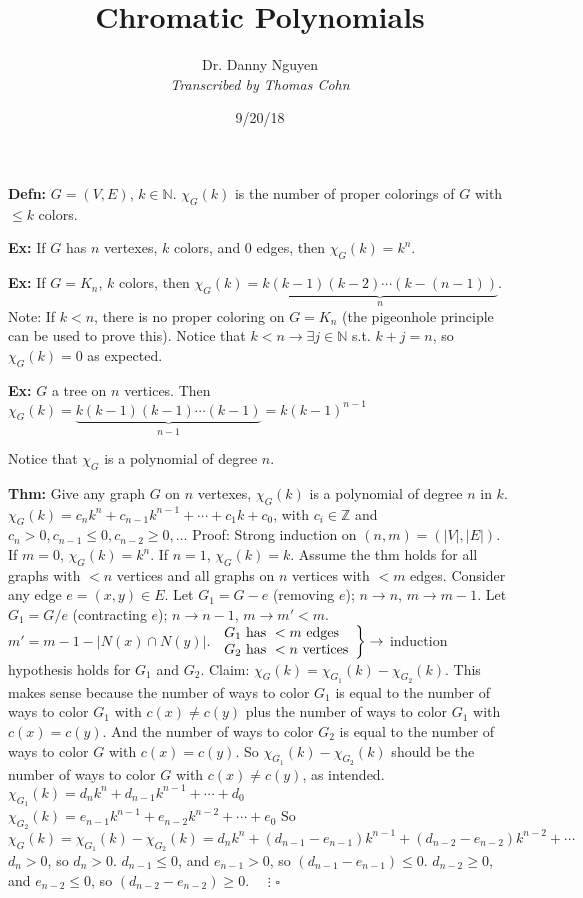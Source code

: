 \documentclass[10pt,letterpaper]{article}
\author{Dr. Danny Nguyen\\ \small\textit{Transcribed by Thomas Cohn}}
\title{Chromatic Polynomials}
\date{9/20/18} %
\newcommand{\n}{\hfill\break}
\newcommand{\defn}[1]{\par\noindent\settowidth{\hangindent}{\textbf{Defn: }}\textbf{Defn: }#1\n}
\newcommand{\thm}[1]{\par\noindent\settowidth{\hangindent}{\textbf{Thm: }}\textbf{Thm: }#1\n}
\newcommand{\ex}[1]{\par\noindent\settowidth{\hangindent}{\textbf{Ex: }}\textbf{Ex: }#1\n}
\newcommand{\proven}{\;$\square$\n}
\newcommand{\ptxt}[1]{\textrm{\textnormal{#1}}}
\newcommand{\card}[1]{\left|#1\right|}
\newcommand{\naturals}{\mathbb{N}}
\newcommand{\N}{\naturals}
\newcommand{\integers}{\mathbb{Z}}
\newcommand{\Z}{\integers}
\newcommand{\st}{s.t.}
\begin{document}
\maketitle
\setlength\RaggedRightParindent{\parindent}
\RaggedRight

\defn{$G=(V,E)$, $k\in\N$.\n
$\chi_{G}(k)$ is the number of proper colorings of $G$ with $\le{}k$ colors.}

\ex{If $G$ has $n$ vertexes, $k$ colors, and $0$ edges, then $\chi_{G}(k)=k^{n}$.}

\ex{If $G=K_{n}$, $k$ colors, then $\chi_{G}(k)=\underbrace{k(k-1)(k-2)\cdots(k-(n-1))}_{n}$.\n
Note: If $k<n$, there is no proper coloring on $G=K_{n}$ (the pigeonhole principle can be used to prove this). Notice that $k<n\to\exists{}j\in\N$ \st{} $k+j=n$, so $\chi_{G}(k)=0$ as expected.}

\ex{$G$ a tree on $n$ vertices. Then $\chi_{G}(k)=\underbrace{k(k-1)(k-1)\cdots(k-1)}_{n-1}=k(k-1)^{n-1}$}

\par\noindent Notice that $\chi_{G}$ is a polynomial of degree $n$.\n

\thm{Give any graph $G$ on $n$ vertexes, $\chi_{G}(k)$ is a polynomial of degree $n$ in $k$.\n
$\chi_{G}(k)=c_{n}k^{n}+c_{n-1}k^{n-1}+\cdots+c_{1}k+c_{0}$, with $c_{i}\in\Z$ and $c_{n}>0,c_{n-1}\le{}0,c_{n-2}\ge{}0,\ldots$\n
Proof: Strong induction on $(n,m)=(\card{V},\card{E})$. If $m=0$, $\chi_{G}(k)=k^{n}$. If $n=1$, $\chi_{G}(k)=k$.\n
Assume the thm holds for all graphs with $<n$ vertices and all graphs on $n$ vertices with $<m$ edges.\n
Consider any edge $e=(x,y)\in{}E$.\n
Let $G_{1}=G-e$ (removing $e$); $n\to{}n$, $m\to{}m-1$.\n
Let $G_{1}=G/e$ (contracting $e$); $n\to{}n-1$, $m\to{}m'<m$. $m'=m-1-\card{N(x)\cap{}N(y)}$.\n
$\left.\begin{array}{l}G_{1}\ptxt{ has }<m\ptxt{ edges}\\ G_{2}\ptxt{ has }<n\ptxt{ vertices}\end{array}\right\}\to$ induction hypothesis holds for $G_{1}$ and $G_{2}$.\n
\n
Claim: $\chi_{G}(k)=\chi_{G_{1}}(k)-\chi_{G_{2}}(k)$. This makes sense because the number of ways to color $G_{1}$ is equal to the number of ways to color $G_{1}$ with $c(x)\ne{}c(y)$ plus the number of ways to color $G_{1}$ with $c(x)=c(y)$. And the number of ways to color $G_{2}$ is equal to the number of ways to color $G$ with $c(x)=c(y)$. So $\chi_{G_{1}}(k)-\chi_{G_{2}}(k)$ should be the number of ways to color $G$ with $c(x)\ne{}c(y)$, as intended.\n
\n
$\chi_{G_{1}}(k)=d_{n}k^{n}+d_{n-1}k^{n-1}+\cdots+d_{0}$\n
$\chi_{G_{2}}(k)=e_{n-1}k^{n-1}+e_{n-2}k^{n-2}+\cdots+e_{0}$\n
So $\chi_{G}(k)=\chi_{G_{1}}(k)-\chi_{G_{2}}(k)=d_{n}k^{n}+(d_{n-1}-e_{n-1})k^{n-1}+(d_{n-2}-e_{n-2})k^{n-2}+\cdots$\n
\n
$d_{n}>0$, so $d_{n}>0$.\n
$d_{n-1}\le{}0$, and $e_{n-1}>0$, so $(d_{n-1}-e_{n-1})\le{}0$.\n
$d_{n-2}\ge{}0$, and $e_{n-2}\le{}0$, so $(d_{n-2}-e_{n-2})\ge{}0$.\n
${}\quad\vdots$\n
\proven}
\end{document}
